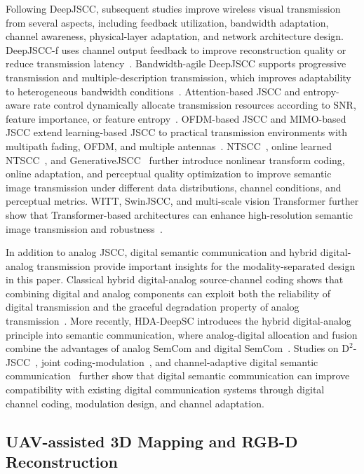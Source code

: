 \documentclass[journal]{IEEEtran}
\begin{document}
Following DeepJSCC, subsequent studies improve wireless visual transmission from several aspects, including feedback utilization, bandwidth adaptation, channel awareness, physical-layer adaptation, and network architecture design. DeepJSCC-f uses channel output feedback to improve reconstruction quality or reduce transmission latency~\cite{B2}. Bandwidth-agile DeepJSCC supports progressive transmission and multiple-description transmission, which improves adaptability to heterogeneous bandwidth conditions~\cite{B3}. Attention-based JSCC and entropy-aware rate control dynamically allocate transmission resources according to SNR, feature importance, or feature entropy~\cite{B4,B5}. OFDM-based JSCC and MIMO-based JSCC extend learning-based JSCC to practical transmission environments with multipath fading, OFDM, and multiple antennas~\cite{B6,B7}. NTSCC~\cite{B8}, online learned NTSCC~\cite{B9}, and GenerativeJSCC~\cite{B10} further introduce nonlinear transform coding, online adaptation, and perceptual quality optimization to improve semantic image transmission under different data distributions, channel conditions, and perceptual metrics. WITT, SwinJSCC, and multi-scale vision Transformer further show that Transformer-based architectures can enhance high-resolution semantic image transmission and robustness~\cite{B11,B12,B13}.

In addition to analog JSCC, digital semantic communication and hybrid digital-analog transmission provide important insights for the modality-separated design in this paper. Classical hybrid digital-analog source-channel coding shows that combining digital and analog components can exploit both the reliability of digital transmission and the graceful degradation property of analog transmission~\cite{B14}. More recently, HDA-DeepSC introduces the hybrid digital-analog principle into semantic communication, where analog-digital allocation and fusion combine the advantages of analog SemCom and digital SemCom~\cite{B15}. Studies on $\mathrm{D}^{2}$-JSCC~\cite{B16}, joint coding-modulation~\cite{B17}, and channel-adaptive digital semantic communication~\cite{B18} further show that digital semantic communication can improve compatibility with existing digital communication systems through digital channel coding, modulation design, and channel adaptation.

\subsection{UAV-assisted 3D Mapping and RGB-D Reconstruction}
\end{document}
